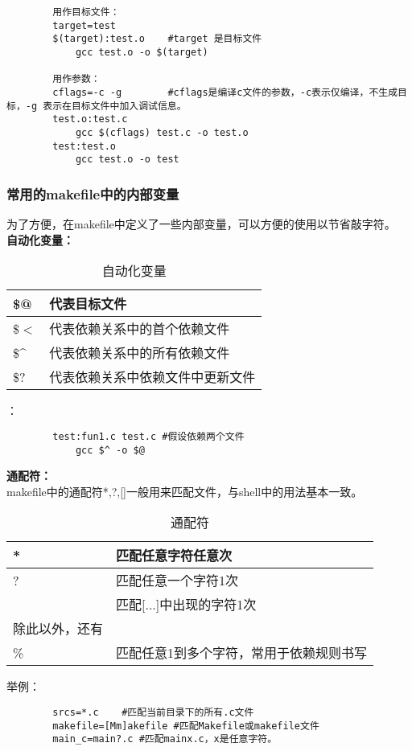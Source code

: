 \documentclass{article}
\begin{document}
\begin{CJK}{UTF8}{gbsn}
\begin{verbatim}
		用作目标文件：
		target=test
		$(target):test.o    #target 是目标文件
		    gcc test.o -o $(target)
		
		用作参数：
		cflags=-c -g		#cflags是编译c文件的参数，-c表示仅编译，不生成目标，-g 表示在目标文件中加入调试信息。	
		test.o:test.c
		    gcc $(cflags) test.c -o test.o
		test:test.o
		    gcc test.o -o test 
	\end{verbatim}		
	\subsubsection{常用的makefile中的内部变量}
	为了方便，在makefile中定义了一些内部变量，可以方便的使用以节省敲字符。\\
	\noindent\textbf{自动化变量：}\\
	\begin{table}[!htp]
	\begin{tabular}{l|l}
		\hline
		\$@ & 代表目标文件\\
		\hline
		\$$<$ & 代表依赖关系中的首个依赖文件\\ 
		\hline	
		\$\^ & 代表依赖关系中的所有依赖文件\\
		\hline	
		\$? &	代表依赖关系中依赖文件中更新文件\\
		\hline	
	\end{tabular}
		\caption{自动化变量}
	\end{table}
			

	：\nolinebreak[2]
	\begin{verbatim}
		test:fun1.c test.c #假设依赖两个文件
		    gcc $^ -o $@
	\end{verbatim}
	\newpage
	\textbf{通配符：}\\makefile中的通配符*,?,[]一般用来匹配文件，与shell中的用法基本一致。\\
	\begin{table}[!htp]
	\begin{tabular}{l|l}
		\hline
		* & 匹配任意字符任意次\\
		\hline
		? & 匹配任意一个字符1次\\
		\hline
		[..] & 匹配[...]中出现的字符1次\\
		\hline
		除此以外，还有 &\\
		\hline
		\% & 匹配任意1到多个字符，常用于依赖规则书写\\
		\hline
	\end{tabular}
		\caption{通配符}
	\end{table}
	
	举例：\nolinebreak[2]
	\begin{verbatim}
		srcs=*.c	#匹配当前目录下的所有.c文件
		makefile=[Mm]akefile #匹配Makefile或makefile文件 
		main_c=main?.c #匹配mainx.c，x是任意字符。
	\end{verbatim}



\end{CJK}
\end{document}
